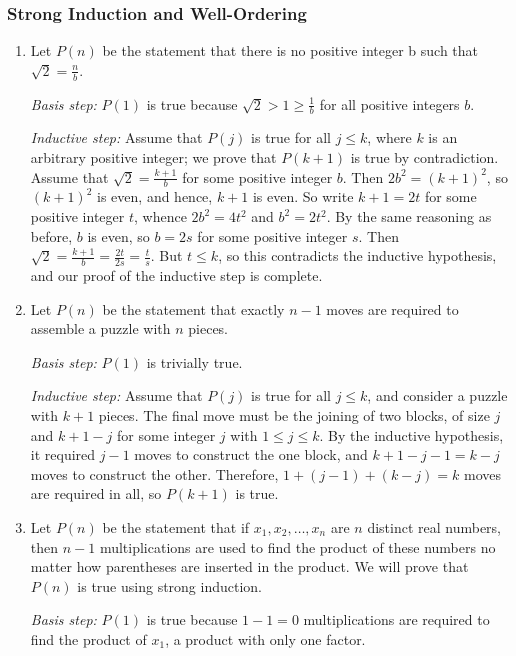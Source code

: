 \documentclass{../../cls/sig-alternate-05-2015}
\begin{document}
\subsubsection{Strong Induction and Well-Ordering}
\begin{enumerate}
\item Let $P(n)$ be the statement that there is no positive integer b such that $\sqrt{2} = \frac{n}{b}$.

\textit{Basis step:} $P(1)$ is true because $\sqrt{2} > 1 \ge \frac{1}{b}$ for all positive integers $b$.

\textit{Inductive step:} Assume that $P (j)$ is true for all
$j \le k$,
where $k$ is an arbitrary positive integer;
we prove that $P(k + 1)$ is true by contradiction.
Assume that $\sqrt{2} = \frac{k + 1}{b}$ for some positive integer $b$.
Then $2b^2 = (k + 1)^2$, so $(k + 1)^2$ is even, and hence,
$k + 1$ is even.
So write $k + 1 = 2t$ for some positive integer $t$,
whence $2b^2 = 4t^2$ and $b^2 = 2t^2$.
By the same reasoning as before, $b$ is even,
so $b = 2s$ for some positive integer $s$.
Then $\sqrt{2} = \frac{k + 1}{b} = \frac{2t}{2s} = \frac{t}{s}$.
But $t \le k$,
so this contradicts the inductive hypothesis,
and our proof of the inductive step is complete.

\item Let $P(n)$ be the statement that exactly $n - 1$ moves are required to assemble a puzzle with $n$ pieces.

\textit{Basis step:} $P(1)$ is trivially true.

\textit{Inductive step:} Assume that $P (j)$ is true for all $j \le k$,
and consider a puzzle with $k + 1$ pieces.
The final move must be the joining of two blocks,
of size $j$ and $k + 1 - j$ for some integer $j$ with $1 \le j \le k$.
By the inductive hypothesis,
it required $j - 1$ moves to construct the one block,
and $k + 1 - j - 1 = k - j$ moves to construct the other.
Therefore, $1 + (j - 1) + (k - j) = k$ moves are required in all,
so $P(k + 1)$ is true.

\item Let $P(n)$ be the statement that if $x_1, x_2, \ldots, x_n$ are $n$ distinct real numbers, then $n - 1$ multiplications are used to find the product of these numbers no matter how parentheses are inserted in the product.
We will prove that $P(n)$ is true using strong induction.

\textit{Basis step:} $P(1)$ is true because $1 - 1 = 0$
multiplications are required to find the product of $x_1$,
a product with only one factor.


\end{enumerate}
\end{document}
